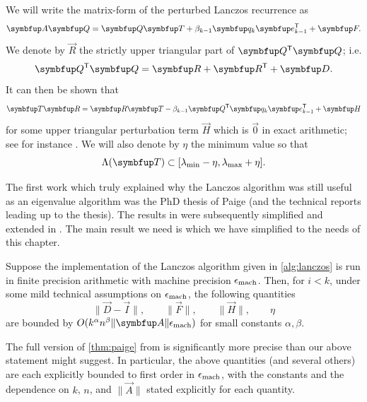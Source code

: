 We will write the matrix-form of the perturbed Lanczos recurrence as
\begin{equation}
    \label{eqn:lanczos_factorization_fp}
    \vec{A} \vec{Q} = \vec{Q} \vec{T} + \beta_{k-1} \vec{q}_{k} \vec{e}_{k-1}^\rT + \vec{F}.
\end{equation}
We denote by \( \vec{R} \) the strictly upper triangular part of \( \vec{Q}^\rT\vec{Q} \); i.e. 
\begin{equation*}
    \vec{Q}^\rT \vec{Q} = \vec{R} + \vec{R}^\rT + \vec{D} .
\end{equation*}
It can then be shown that 
\begin{equation*}
    \label{eqn:lanczos_R_factorization_fp}
    \vec{T} \vec{R} =  \vec{R} \vec{T}  - \beta_{k-1}\vec{Q}^\rT \vec{q}_k\vec{e}_{k-1}^\rT + \vec{H}
\end{equation*}
for some upper triangular perturbation term \( \vec{H} \) which is \( \vec{0} \) in exact arithmetic; see for instance \cite[Equation 41]{paige_76}.
We will also denote by \( \eta \) the minimum value so that
\begin{equation*}
    \Lambda\mf{\vec{T}} \subset [\lmin - \eta, \lmax+\eta].
\end{equation*}
    

The first work which truly explained why the Lanczos algorithm was still useful as an eigenvalue algorithm was the PhD thesis \cite{paige_71} of Paige (and the technical reports leading up to the thesis).
The results in \cite{paige_71} were subsequently simplified and extended in \cite{paige_72,paige_76,paige_80}.
The main result we need is \cite[Theorem 1]{paige_76} which we have simplified to the needs of this chapter.
\begin{theorem}
    \label{thm:paige}
    Suppose the implementation of the Lanczos algorithm given in \cref{alg:lanczos} is run in finite precision arithmetic with machine precision \( \epsilon_{\textup{mach}} \). 
    Then, for \( i<k \), under some mild technical assumptions on \( \epsilon_{\textup{mach}} \),
    the following quantities 
    \begin{equation*}
        \| \vec{D} - \vec{I} \|
        ,\qquad
        \| \vec{F} \| 
        ,\qquad
        \| \vec{H} \| 
        ,\qquad
        \eta
    \end{equation*}
    are bounded by \( O(k^\alpha n^\beta \| \vec{A} \| \epsilon_{\textup{mach}}) \) for small constants \( \alpha,\beta \).
\end{theorem}

\begin{remark}
    The full version of \cref{thm:paige} from \cite{paige_76} is significantly more precise than our above statement might suggest.
    In particular, the above quantities (and several others) are each explicitly bounded to first order in \( \epsilon_{\textup{mach}} \), with the constants and the dependence on \( k \), \( n \), and \( \| \vec{A} \| \) stated explicitly for each quantity.
\end{remark}

